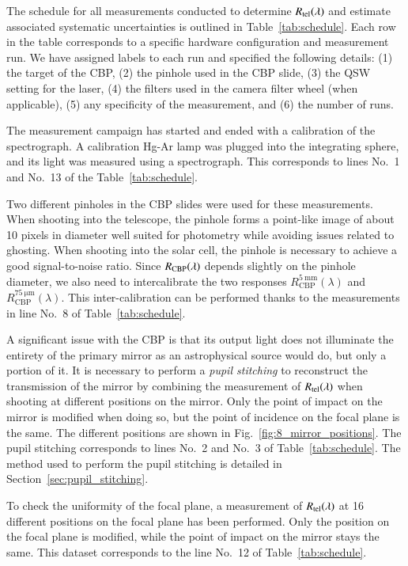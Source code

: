 The schedule for all measurements conducted to determine $R_{\mathrm{tel}}(\lambda)$ and estimate associated systematic uncertainties is outlined in Table~\ref{tab:schedule}. Each row in the table corresponds to a specific hardware configuration and measurement run. We have assigned labels to each run and specified the following details: (1) the target of the CBP, (2) the pinhole used in the CBP slide, (3) the QSW setting for the laser, (4) the filters used in the \SD camera filter wheel (when applicable), (5) any specificity of the measurement, and (6) the number of runs.

The measurement campaign has started and ended with a calibration of the spectrograph. A calibration Hg-Ar lamp was plugged into the integrating sphere, and its light was measured using a spectrograph. This corresponds to lines No.~1 and No.~13 of the Table~\ref{tab:schedule}.

Two different pinholes in the CBP slides were used for these measurements. When shooting into the \SD telescope, the \spinhole pinhole forms a point-like image of about 10 pixels in diameter well suited for photometry while avoiding issues related to ghosting. When shooting into the solar cell, the \bpinhole pinhole is necessary to achieve a good signal-to-noise ratio. Since $R_{\mathrm{CBP}}(\lambda)$ depends slightly on the pinhole diameter, we also need to intercalibrate the two responses $R_\mathrm{CBP}^{\mathrm{\SI{5}{\milli\meter}}} (\lambda)$ and $R_\mathrm{CBP}^{\mathrm{\SI{75}{\micro\meter}}} (\lambda)$. This inter-calibration can be performed thanks to the measurements in line No.~8 of Table~\ref{tab:schedule}.

A significant issue with the CBP is that its output light does not illuminate the entirety of the \SD primary mirror as an astrophysical source would do, but only a portion of it. It is necessary to perform a \textit{pupil stitching} to reconstruct the transmission of the mirror by combining the measurement of $R_{\mathrm{tel}}(\lambda)$ when shooting at different positions on the mirror. Only the point of impact on the mirror is modified when doing so, but the point of incidence on the focal plane is the same. The different positions are shown in Fig.~\ref{fig:8_mirror_positions}. The pupil stitching corresponds to lines No.~2 and No.~3 of Table~\ref{tab:schedule}. The method used to perform the pupil stitching is detailed in Section~\ref{sec:pupil_stitching}.

To check the uniformity of the \SD focal plane, a measurement of $R_{\mathrm{tel}}(\lambda)$ at 16 different positions on the focal plane has been performed. Only the position on the focal plane is modified, while the point of impact on the mirror stays the same. This dataset corresponds to the line No.~12 of Table~\ref{tab:schedule}. 

